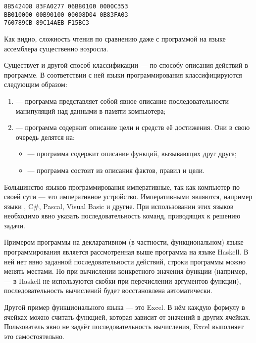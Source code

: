 \begin{lstlisting}
8B542408 83FA0277 06B80100 0000C353
BB010000 00B90100 00008D04 0B83FA03
760789CB 89C14AEB F15BC3
\end{lstlisting}

Как видно, сложность чтения по сравнению даже с программой на языке
ассемблера существенно возросла.

Существует и другой способ классификации — по способу описания
действий в программе.  В соответствии с ней языки программирования
классифицируются следующим образом:

\begin{enumerate}
\item {} — программа представляет
  собой явное описание последовательности манипуляций над данными в
  памяти компьютера;
\item {} — программа содержит
  описание цели и средств её достижения. Они в свою очередь делятся
  на:
  \begin{itemize}
  \item {} — программа
    содержит описание функций, вызывающих друг друга;
  \item {} — программа состоит из
    описания фактов, правил и цели.
  \end{itemize}
\end{enumerate}

Большинство языков программирования императивные, так как компьютер по
своей сути — это императивное устройство. Императивными являются,
например языки \CPP, C\#, Pascal, Visual Basic и другие. При
использовании этих языков необходимо явно указать последовательность
команд, приводящих к решению задачи.

Примером программы на декларативном (в частности, функциональном)
языке программирования является рассмотренная выше программа на языке
Haskell. В ней нет явно заданной последовательности действий, строки
программы можно менять местами. Но при вычислении конкретного значения
функции (например,  — в Haskell не используются скобки при
перечислении аргументов функции), последовательность вычислений будет
восстановлена автоматически.

Другой пример функционального языка — это Excel. В нём каждую формулу
в ячейках можно считать функцией, которая зависит от значений в других
ячейках. Пользователь явно не задаёт последовательность вычисления,
Excel выполняет это самостоятельно.

